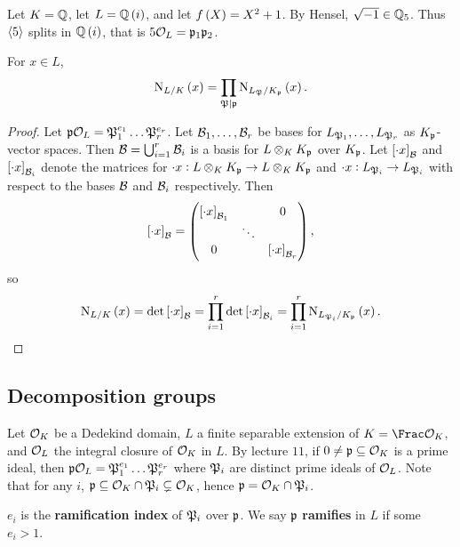\begin{example*}
Let $ K = \mathbb{Q} $, let $ L = \QQ\br{i} $, and let $ f\br{X} = X^2 + 1 $. By Hensel, $ \sqrt{-1} \in \mathbb{Q}_5 $. Thus $ \left\langle 5 \right\rangle $ splits in $ \QQ\br{i} $, that is $ 5\mathcal{O}_L = \mathfrak{p}_1\mathfrak{p}_2 $.
\end{example*}

\begin{corollary}
For $ x \in L $,
$$ \N_{L / K}\br{x} = \prod_{\pp \mid \ppp} \N_{L_\pp / K_\ppp}\br{x}. $$
\end{corollary}

\begin{proof}
Let $ \mathfrak{p}\mathcal{O}_L = \mathfrak{P}_1^{e_1} \dots \mathfrak{P}_r^{e_r} $. Let $ \mathcal{B}_1, \dots, \mathcal{B}_r $ be bases for $ L_{\mathfrak{P}_1}, \dots, L_{\mathfrak{P}_r} $ as $ K_{\mathfrak{p}} $-vector spaces. Then $ \mathcal{B} = \bigcup_{i = 1}^r \mathcal{B}_i $ is a basis for $ L \otimes_K K_{\mathfrak{p}} $ over $ K_{\mathfrak{p}} $. Let $ \sbr{\cdot x}_\BBB $ and $ \sbr{\cdot x}_{\BBB_i} $ denote the matrices for $ \cdot x : L \otimes_K K_{\mathfrak{p}} \to L \otimes_K K_{\mathfrak{p}} $ and $ \cdot x : L_{\mathfrak{P}_i} \to L_{\mathfrak{P}_i} $ with respect to the bases $ \mathcal{B} $ and $ \mathcal{B}_i $ respectively. Then
$$ \sbr{\cdot x}_\BBB = \threebythree{\sbr{\cdot x}_{\BBB_1}}{}{0}{}{\ddots}{}{0}{}{\sbr{\cdot x}_{\BBB_r}}, $$
so
$$ \N_{L / K}\br{x} = \det \sbr{\cdot x}_\BBB = \prod_{i = 1}^r \det \sbr{\cdot x}_{\BBB_i} = \prod_{i = 1}^r \N_{L_{\pp_i} / K_\ppp}\br{x}. $$
\end{proof}

\subsection{Decomposition groups}


Let $ \mathcal{O}_K $ be a Dedekind domain, $ L $ a finite separable extension of $ K = \Frac \OOO_K $, and $ \mathcal{O}_L $ the integral closure of $ \mathcal{O}_K $ in $ L $. By lecture $ 11 $, if $ 0 \ne \mathfrak{p} \subseteq \mathcal{O}_K $ is a prime ideal, then $ \mathfrak{p}\mathcal{O}_L = \mathfrak{P}_1^{e_1} \dots \mathfrak{P}_r^{e_r} $ where $ \mathfrak{P}_i $ are distinct prime ideals of $ \mathcal{O}_L $. Note that for any $ i $, $ \mathfrak{p} \subseteq \mathcal{O}_K \cap \mathfrak{P}_i \subsetneq \mathcal{O}_K $, hence $ \mathfrak{p} = \mathcal{O}_K \cap \mathfrak{P}_i $.

\pagebreak

\begin{definition}
$ e_i $ is the \textbf{ramification index} of $ \mathfrak{P}_i $ over $ \mathfrak{p} $. We say $ \mathfrak{p} $ \textbf{ramifies} in $ L $ if some $ e_i > 1 $.
\end{definition}

